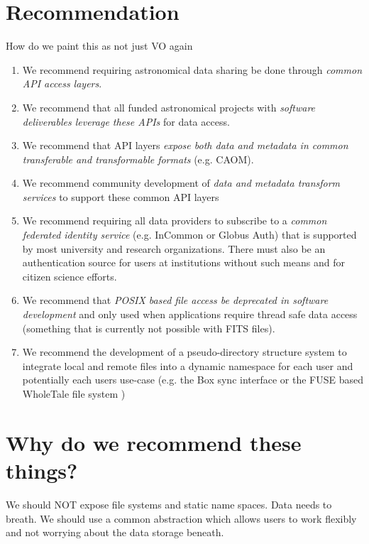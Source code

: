 \section{Recommendation }

How do we paint this as not just VO again

\begin{enumerate}
\item We recommend requiring astronomical data sharing be done through \emph{common API
access layers}.

\item We recommend that all funded astronomical projects with \emph{software deliverables
leverage these APIs} for data access. 

\item We recommend that API layers \emph{expose both data and metadata in common 
transferable and transformable formats} (e.g. CAOM).

\item We recommend community development of \emph{data and metadata transform services}
to support these common API layers 

\item We recommend requiring all data providers to subscribe to a 
\emph{common federated identity service} (e.g. InCommon or 
Globus Auth) that is supported by most university and research organizations. There 
must also be 
an authentication source for users at institutions without such means and for 
citizen science efforts.

\item We recommend that \emph{POSIX based file access be deprecated
in software development} and only used when applications require thread safe
data access (something that is currently not possible with FITS files).

\item We recommend the development of a pseudo-directory structure system to
integrate local and remote files into a dynamic namespace for each user and potentially
each users use-case (e.g. the Box sync interface or the FUSE based WholeTale file system
\citep{BRINCKMAN2019854}) 


\end{enumerate}

\section{Why do we recommend these things?}


We should NOT expose file systems and static name spaces.  Data needs to breath. We should use a common abstraction which allows users to work flexibly and not worrying about the data storage beneath.

